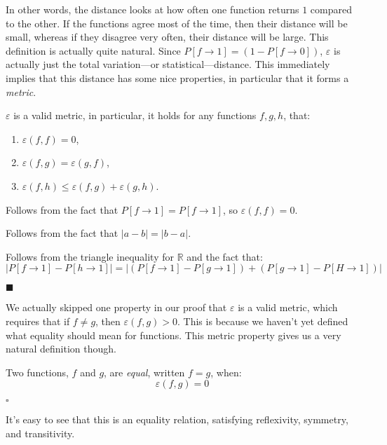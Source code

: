In other words, the distance looks at how often one function returns $1$
compared to the other.
If the functions agree most of the time, then their distance will be small,
whereas if they disagree very often, their distance will be large.
This definition is actually quite natural.
Since $P[f \to 1] = (1 - P[f \to 0])$, $\varepsilon$ is actually
just the total variation---or statistical---distance.
This immediately implies that this distance has some nice properties,
in particular that it forms a \emph{metric}.

\begin{lemma}
    $\varepsilon$ is a valid metric, in particular, it holds
    for any functions $f, g, h$, that:
    \begin{enumerate}
        \item $\varepsilon(f, f) = 0$,
        \item $\varepsilon(f, g) = \varepsilon(g, f)$,
        \item $\varepsilon(f, h) \leq \varepsilon(f, g) + \varepsilon(g, h)$.
    \end{enumerate}


     Follows from the fact that $P[f \to 1] = P[f \to 1]$,
    so $\varepsilon(f, f) = 0$.

     Follows from the fact that $|a - b| = |b - a|$.

     Follows from the triangle inequality for $\mathbb{R}$
    and the fact that:
    $$
    |P[f \to 1] - P[h \to 1]| = |(P[f \to 1] - P[g \to 1]) + (P[g \to 1] - P[H \to 1])|
    $$

    $\blacksquare$
\end{lemma}

We actually skipped one property in our proof that $\varepsilon$ is a valid metric,
which requires that if $f \neq g$, then $\varepsilon(f, g) > 0$.
This is because we haven't yet defined what equality should mean
for functions.
This metric property gives us a very natural definition though.

\begin{definition}
    Two functions, $f$ and $g$, are \emph{equal}, written $f = g$, when:
    $$
    \varepsilon(f, g) = 0
    $$

    $\square$
\end{definition}

It's easy to see that this is an equality relation, satisfying
reflexivity, symmetry, and transitivity.

